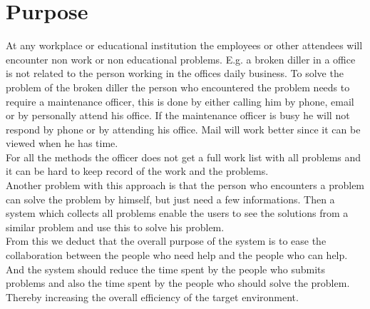 \newcommand{\lightbulb}{diller}
\section{Purpose}
At any workplace or educational institution the employees or other attendees will encounter non work or non educational problems. 
E.g. a broken \lightbulb{} in a office is not related to the person working in the offices daily business. 
To solve the problem of the broken \lightbulb{} the person who encountered the problem needs to require a maintenance officer, this is done by either calling him by phone, email or by personally attend his office. 
If the maintenance officer is busy he will not respond by phone or by attending his office. Mail will work better since it can be viewed when he has time.\\

For all the methods the officer does not get a full work list with all problems and it can be hard to keep record of the work and the problems.\\
Another problem with this approach is that the person who encounters a problem can solve the problem by himself, but just need a few informations. Then a system which collects all problems enable the users to see the solutions from a similar problem and use this to solve his problem. \\

From this we deduct that the overall purpose of the system is to ease the collaboration between the people who need help and the people who can help. \\
And the system should reduce the time spent by the people who submits problems and also the time spent by the people who should solve the problem. \\
Thereby increasing the overall efficiency of the target environment. 


